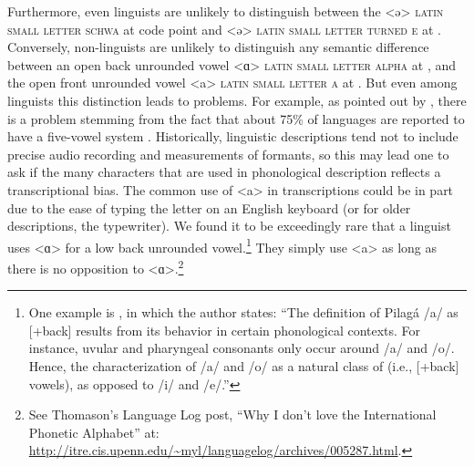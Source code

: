 Furthermore, even linguists are unlikely to distinguish between
the <ə> \textsc{latin small letter schwa} at code point  and <ǝ>
\textsc{latin small letter turned e} at . Conversely,
non-linguists are unlikely to distinguish any semantic difference between an
open back unrounded vowel <ɑ> \textsc{latin small letter alpha} at
, and the open front unrounded vowel <a> \textsc{latin small letter
a} at . But even among linguists this distinction leads to problems.
For example, as pointed out by \citet{Mielke2009}, there is a problem stemming
from the fact that about 75\% of languages are reported to have a five-vowel
system \citep{Maddieson1984}. Historically, linguistic descriptions tend not to
include precise audio recording and measurements of formants, so this may lead
one to ask if the many characters that are used in phonological description
reflects a transcriptional bias. The common use of <a> in transcriptions
could be in part due to the ease of typing the letter on an English keyboard (or
for older descriptions, the typewriter). We found it to be exceedingly rare that
a linguist uses <ɑ> for a low back unrounded vowel.\footnote{One example is
\citet[75]{Vidal2001a}, in which the author states: ``The definition of Pilagá
/a/ as [+back] results from its behavior in certain phonological contexts.
For instance, uvular and pharyngeal consonants only occur around /a/ and /o/.
Hence, the characterization of /a/ and /o/ as a natural class of (i.e.,
[+back] vowels), as opposed to /i/ and /e/.''} They simply use <a> as
long as there is no opposition to <ɑ>.\footnote{See Thomason's Language Log
post, ``Why I don't love the International Phonetic Alphabet'' at:
\url{http://itre.cis.upenn.edu/~myl/languagelog/archives/005287.html}.}

